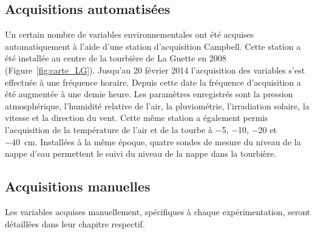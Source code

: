 \subsection{Acquisitions automatisées}

Un certain nombre de variables environnementales ont été acquises automatiquement à l'aide d'une station d'acquisition Campbell\textsuperscript{\textregistered}.
Cette station a été installée au centre de la tourbière de La Guette en 2008 (Figure~\ref{fig:carte_LG}).
Jusqu'au 20 février 2014 l'acquisition des variables s'est effectuée à une fréquence horaire.
Depuis cette date la fréquence d'acquisition a été augmentée à une demie heure.
Les paramètres enregistrés sont la pression atmosphérique, l'humidité relative de l'air, la pluviométrie, l'irradiation solaire, la vitesse et la direction du vent. 
Cette même station a également permis l'acquisition de la température de l'air et de la tourbe à \num{-5}, \num{-10}, \num{-20} et \SIlist{-40}{\cm}.
Installées à la même époque, quatre sondes de mesure du niveau de la nappe d'eau permettent le suivi du niveau de la nappe dans la tourbière.

\subsection{Acquisitions manuelles}

Les variables acquises manuellement, spécifiques à chaque expérimentation, seront détaillées dans leur chapitre respectif.



